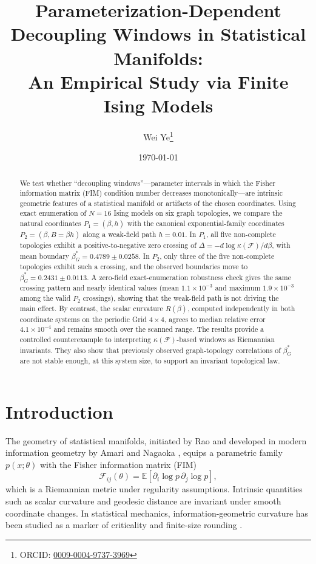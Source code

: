 \documentclass[11pt,a4paper]{article}
\title{\textbf{Parameterization-Dependent Decoupling Windows in Statistical Manifolds:\\
An Empirical Study via Finite Ising Models}}
\author{Wei Ye\thanks{ORCID: \href{https://orcid.org/0009-0004-9737-3969}{0009-0004-9737-3969}}}
\affil{Independent Researcher}
\date{\today}
\begin{document}
\maketitle

\begin{abstract}
\noindent
We test whether ``decoupling windows''---parameter intervals in which the Fisher information matrix (FIM) condition number decreases monotonically---are intrinsic geometric features of a statistical manifold or artifacts of the chosen coordinates.  Using exact enumeration of $N=16$ Ising models on six graph topologies, we compare the natural coordinates $P_1=(\beta,h)$ with the canonical exponential-family coordinates $P_2=(\beta,B=\beta h)$ along a weak-field path $h=0.01$.  In $P_1$, all five non-complete topologies exhibit a positive-to-negative zero crossing of $\Delta=-d\log\kappa(\mathcal F)/d\beta$, with mean boundary $\beta_G^*=0.4789\pm0.0258$.  In $P_2$, only three of the five non-complete topologies exhibit such a crossing, and the observed boundaries move to $\beta_G^*=0.2431\pm0.0113$.  A zero-field exact-enumeration robustness check gives the same crossing pattern and nearly identical values (mean $1.1\times10^{-3}$ and maximum $1.9\times10^{-3}$ among the valid $P_2$ crossings), showing that the weak-field path is not driving the main effect.  By contrast, the scalar curvature $R(\beta)$, computed independently in both coordinate systems on the periodic Grid $4\times4$, agrees to median relative error $4.1\times10^{-4}$ and remains smooth over the scanned range.  The results provide a controlled counterexample to interpreting $\kappa(\mathcal F)$-based windows as Riemannian invariants.  They also show that previously observed graph-topology correlations of $\beta_G^*$ are not stable enough, at this system size, to support an invariant topological law.
\end{abstract}

\section{Introduction}
\label{sec:intro}

The geometry of statistical manifolds, initiated by Rao and developed in modern information geometry by Amari and Nagaoka \citep{rao1945information, amari2000methods}, equips a parametric family $p(x;\theta)$ with the Fisher information matrix (FIM)
\begin{equation}
\mathcal F_{ij}(\theta)=\mathbb E[\partial_i\log p\,\partial_j\log p],
\end{equation}
which is a Riemannian metric under regularity assumptions.  Intrinsic quantities such as scalar curvature and geodesic distance are invariant under smooth coordinate changes.  In statistical mechanics, information-geometric curvature has been studied as a marker of criticality and finite-size rounding \citep{rup1995riemannian, brody2003information, janke2004information}.
\end{document}
